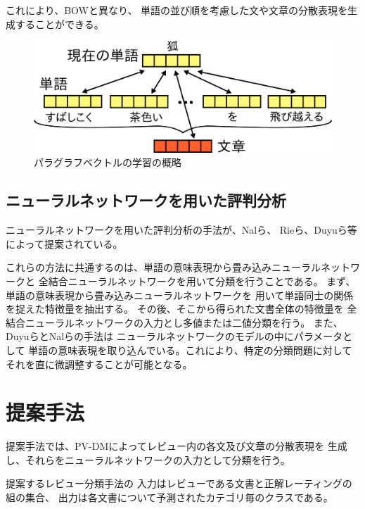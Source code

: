 \documentclass[twocolumn,a4paper]{ltjarticle}
\makeatletter
\let\tti@includegraphics\includegraphics
\renewcommand{\includegraphics}[1]{%
    \tti@includegraphics[width=\linewidth]{#1}}
\makeatother
\begin{document}
これにより、BOWと異なり、
単語の並び順を考慮した文や文章の分散表現を生成することができる。

\begin{figure}[t]
  \includegraphics{fig/paragraph_vector.png}
  \caption{パラグラフベクトルの学習の概略}
  \label{fig:ParagraphVector}
\end{figure}


\subsection{ニューラルネットワークを用いた評判分析}

ニューラルネットワークを用いた評判分析の手法が、Nalら\cite{nal14}、
Rieら\cite{rie14}、Duyuら\cite{duyu15}等によって提案されている。

これらの方法に共通するのは、単語の意味表現から畳み込みニューラルネットワークと
全結合ニューラルネットワークを用いて分類を行うことである。
まず、単語の意味表現から畳み込みニューラルネットワークを
用いて単語同士の関係を捉えた特徴量を抽出する。
その後、そこから得られた文書全体の特徴量を
全結合ニューラルネットワークの入力とし多値または二値分類を行う。
また、Duyuら\cite{duyu15}とNalら\cite{nal14}の手法は
ニューラルネットワークのモデルの中にパラメータとして
単語の意味表現を取り込んでいる。これにより、特定の分類問題に対して
それを直に微調整することが可能となる。



\section{提案手法}

提案手法では、PV-DMによってレビュー内の各文及び文章の分散表現を
生成し、それらをニューラルネットワークの入力として分類を行う。

提案するレビュー分類手法の
入力はレビューである文書と正解レーティングの組の集合、
出力は各文書について予測されたカテゴリ毎のクラスである。
\end{document}
